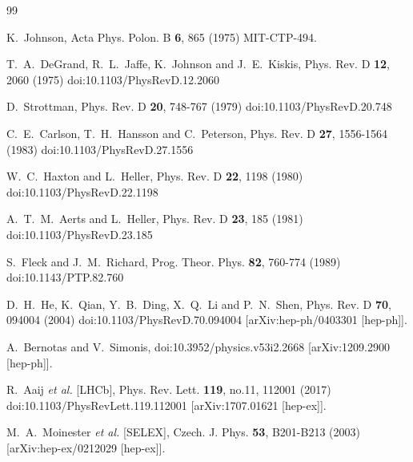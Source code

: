 \documentclass[prd,twocolumn,floatfix,nofootinbib]{revtex4}
\begin{document}
\begin{thebibliography}{99}

    K.~Johnson,
    Acta Phys. Polon. B \textbf{6}, 865 (1975)
    MIT-CTP-494.

    T.~A.~DeGrand, R.~L.~Jaffe, K.~Johnson and J.~E.~Kiskis,
    Phys. Rev. D \textbf{12}, 2060 (1975)
    doi:10.1103/PhysRevD.12.2060

    D.~Strottman,
    Phys. Rev. D \textbf{20}, 748-767 (1979)
    doi:10.1103/PhysRevD.20.748

    C.~E.~Carlson, T.~H.~Hansson and C.~Peterson,
    Phys. Rev. D \textbf{27}, 1556-1564 (1983)
    doi:10.1103/PhysRevD.27.1556

    W.~C.~Haxton and L.~Heller,
    Phys. Rev. D \textbf{22}, 1198 (1980)
    doi:10.1103/PhysRevD.22.1198

    A.~T.~M.~Aerts and L.~Heller,
    Phys. Rev. D \textbf{23}, 185 (1981)
    doi:10.1103/PhysRevD.23.185

    S.~Fleck and J.~M.~Richard,
    Prog. Theor. Phys. \textbf{82}, 760-774 (1989)
    doi:10.1143/PTP.82.760

    D.~H.~He, K.~Qian, Y.~B.~Ding, X.~Q.~Li and P.~N.~Shen,
    Phys. Rev. D \textbf{70}, 094004 (2004)
    doi:10.1103/PhysRevD.70.094004
    [arXiv:hep-ph/0403301 [hep-ph]].

    A.~Bernotas and V.~Simonis,
    doi:10.3952/physics.v53i2.2668
    [arXiv:1209.2900 [hep-ph]].

    R.~Aaij \textit{et al.} [LHCb],
    Phys. Rev. Lett. \textbf{119}, no.11, 112001 (2017)
    doi:10.1103/PhysRevLett.119.112001
    [arXiv:1707.01621 [hep-ex]].

    M.~A.~Moinester \textit{et al.} [SELEX],
    Czech. J. Phys. \textbf{53}, B201-B213 (2003)
    [arXiv:hep-ex/0212029 [hep-ex]].


\end{thebibliography}
\end{document}
